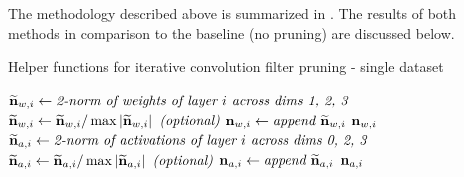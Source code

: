 \documentclass{article}
\begin{document}
The methodology described above is summarized in .
The results of both methods in comparison to the baseline (no pruning) are discussed below.

\begin{algorithm}[t]
	\caption{Helper functions for iterative convolution filter pruning - single dataset} \label{FilterPruneBasic}
	\begin{algorithmic}[1]
				\State $\widetilde{\bm{\mathrm{n}}}_{w,i} \gets \textit{2-norm of weights of layer }i\textit{ across dims 1, 2, 3}$
				\State $\widetilde{\bm{\mathrm{n}}}_{w,i} \gets \widetilde{\bm{\mathrm{n}}}_{w,i} / \max\left \lvert \widetilde{\bm{\mathrm{n}}}_{w,i} \right\rvert \textit{ (optional)}$
				\State $\bm{\mathrm{n}}_{w,i} \gets \textit{append }\widetilde{\bm{\mathrm{n}}}_{w,i}$
			\EndFor
			\State \Return $\bm{\mathrm{n}}_{w,i}$
		\EndFunction
		\\
				\State $\widetilde{\bm{\mathrm{n}}}_{a,i} \gets \textit{2-norm of activations of layer }i\textit{ across dims 0, 2, 3}$
				\State $\widetilde{\bm{\mathrm{n}}}_{a,i} \gets \widetilde{\bm{\mathrm{n}}}_{a,i} / \max\left \lvert \widetilde{\bm{\mathrm{n}}}_{a,i} \right\rvert \textit{ (optional)}$
				\State $\bm{\mathrm{n}}_{a,i} \gets \textit{append }\widetilde{\bm{\mathrm{n}}}_{a,i}$
			\EndFor
			\State \Return $\bm{\mathrm{n}}_{a,i}$
		\EndFunction
%
	\end{algorithmic}
\end{algorithm}
\end{document}
